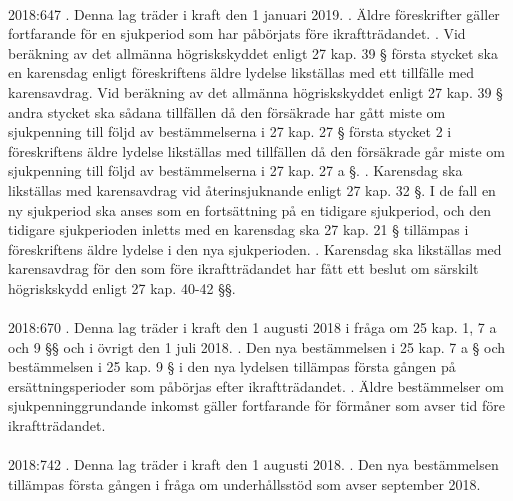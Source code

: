 \documentclass[a4paper,notitlepage,openany,10pt]{book}
\begin{document}
\paragraph*{}
2018:647
. Denna lag träder i kraft den 1 januari 2019.
. Äldre föreskrifter gäller fortfarande för en sjukperiod som har påbörjats före ikraftträdandet.
. Vid beräkning av det allmänna högriskskyddet enligt 27 kap. 39 § första stycket ska en karensdag enligt föreskriftens äldre lydelse likställas med ett tillfälle med karensavdrag. Vid beräkning av det allmänna högriskskyddet enligt 27 kap. 39 § andra stycket ska sådana tillfällen då den försäkrade har gått miste om sjukpenning till följd av bestämmelserna i 27 kap. 27 § första stycket 2 i föreskriftens äldre lydelse likställas med tillfällen då den försäkrade går miste om sjukpenning till följd av bestämmelserna i 27 kap. 27 a §.
. Karensdag ska likställas med karensavdrag vid återinsjuknande enligt 27 kap. 32 §. I de fall en ny sjukperiod ska anses som en fortsättning på en tidigare sjukperiod, och den tidigare sjukperioden inletts med en karensdag ska 27 kap. 21 § tillämpas i föreskriftens äldre lydelse i den nya sjukperioden.
. Karensdag ska likställas med karensavdrag för den som före ikraftträdandet har fått ett beslut om särskilt högriskskydd enligt 27 kap. 40-42 §§.
\paragraph*{}
2018:670
. Denna lag träder i kraft den 1 augusti 2018 i fråga om 25 kap. 1, 7 a och 9 §§ och i övrigt den 1 juli 2018.
. Den nya bestämmelsen i 25 kap. 7 a § och bestämmelsen i 25 kap. 9 § i den nya lydelsen tillämpas första gången på ersättningsperioder som påbörjas efter ikraftträdandet.
. Äldre bestämmelser om sjukpenninggrundande inkomst gäller fortfarande för förmåner som avser tid före ikraftträdandet.
\paragraph*{}
2018:742
. Denna lag träder i kraft den 1 augusti 2018.
. Den nya bestämmelsen tillämpas första gången i fråga om underhållsstöd som avser september 2018.
\end{document}
